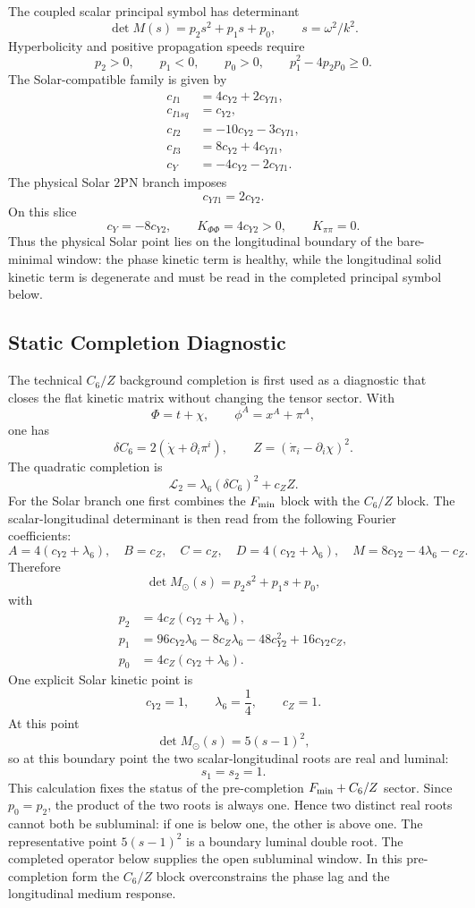 \documentclass[12pt,a4paper]{article}
\begin{document}
The coupled scalar principal symbol has determinant
\[
\det M(s)=p_2s^2+p_1s+p_0,\qquad s=\omega^2/k^2.
\]
Hyperbolicity and positive propagation speeds require
\[
p_2>0,\qquad p_1<0,\qquad p_0>0,\qquad
p_1^2-4p_2p_0\ge 0.
\]
The Solar-compatible family is given by
\begin{align*}
c_{I1}&=4c_{Y2}+2c_{YI1},\\
c_{I1sq}&=c_{Y2},\\
c_{I2}&=-10c_{Y2}-3c_{YI1},\\
c_{I3}&=8c_{Y2}+4c_{YI1},\\
c_Y&=-4c_{Y2}-2c_{YI1}.
\end{align*}
The physical Solar $2$PN branch imposes
\[
c_{YI1}=2c_{Y2}.
\]
On this slice
\[
c_Y=-8c_{Y2},\qquad
K_{\Phi\Phi}=4c_{Y2}>0,\qquad
K_{\pi\pi}=0.
\]
Thus the physical Solar point lies on the longitudinal boundary of the
bare-minimal window: the phase kinetic term is healthy, while the longitudinal
solid kinetic term is degenerate and must be read in the completed principal
symbol below.

\subsection{Static Completion Diagnostic}

The technical $C_6/Z$ background completion is first used as a diagnostic that
closes the flat kinetic matrix without changing the tensor sector. With
\[
\Phi=t+\chi,\qquad \phi^A=x^A+\pi^A,
\]
one has
\[
\delta C_6=2(\dot\chi+\partial_i\pi^i),
\qquad
Z=(\dot\pi_i-\partial_i\chi)^2.
\]
The quadratic completion is
\[
\mathcal L_2=\lambda_6(\delta C_6)^2+c_Z Z.
\]
For the Solar branch one first combines the $F_{\rm min}$ block with the
$C_6/Z$ block.  The scalar-longitudinal determinant is then read from the
following Fourier coefficients:
\[
A=4(c_{Y2}+\lambda_6),\quad B=c_Z,\quad C=c_Z,\quad
D=4(c_{Y2}+\lambda_6),\quad
M=8c_{Y2}-4\lambda_6-c_Z.
\]
Therefore
\[
\det M_\odot(s)=p_2s^2+p_1s+p_0,
\]
with
\begin{align*}
p_2&=4c_Z(c_{Y2}+\lambda_6),\\
p_1&=96c_{Y2}\lambda_6-8c_Z\lambda_6-48c_{Y2}^2+16c_{Y2}c_Z,\\
p_0&=4c_Z(c_{Y2}+\lambda_6).
\end{align*}
One explicit Solar kinetic point is
\[
c_{Y2}=1,\qquad \lambda_6=\frac14,\qquad c_Z=1.
\]
At this point
\[
\det M_\odot(s)=5(s-1)^2,
\]
so at this boundary point the two scalar-longitudinal roots are real and
luminal:
\[
s_1=s_2=1.
\]
This calculation fixes the status of the pre-completion $F_{\rm min}+C_6/Z$ sector.
Since $p_0=p_2$, the product of the two roots is always one.  Hence two
distinct real roots cannot both be subluminal: if one is below one, the other
is above one.  The representative point $5(s-1)^2$ is a boundary luminal
double root. The completed operator below supplies the open subluminal window.
In this pre-completion form the $C_6/Z$ block overconstrains the phase lag and the
longitudinal medium response.
\end{document}
